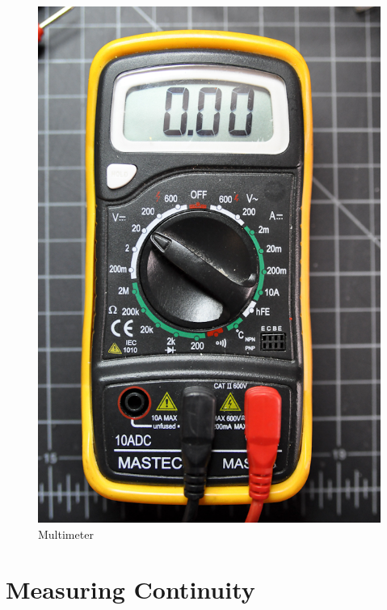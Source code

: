 \begin{figure}[!htb]
 \centering
 \includegraphics[scale=0.3]{img/electronics/multimeter_voltage.jpg}
 \caption{Multimeter}
 \label{Multimeter}
\end{figure}

\section{Measuring Continuity}


